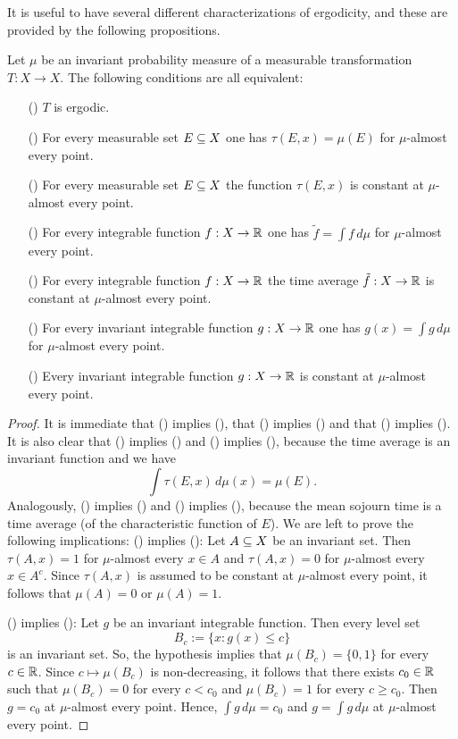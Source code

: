 It is useful to have several different characterizations of ergodicity, and these are provided by the following propositions.
\begin{proposition}\label{ergodic iff invariant function constant}
Let $\mu$ be an invariant probability measure of a measurable transformation $T:X\to X$. The following conditions are all equivalent:
\begin{itemize}
\item[(\rmnum{1})] $T$ is ergodic.
\item[(\rmnum{2})] For every measurable set $E\subseteq X$ one has $\tau(E,x)=\mu(E)$ for $\mu$-almost every point.
\item[(\rmnum{3})] For every measurable set $E\subseteq X$ the function $\tau(E,x)$ is constant at $\mu$-almost every point.
\item[(\rmnum{4})] For every integrable function $f:X\to\mathbb{R}$ one has $\tilde{f}=\int f\,d\mu$ for $\mu$-almost every point.
\item[(\rmnum{5})] For every integrable function $f:X\to\mathbb{R}$ the time average $\tilde{f}:X\to\mathbb{R}$ is constant at $\mu$-almost every point.
\item[(\rmnum{6})] For every invariant integrable function $g:X\to\mathbb{R}$ one has $g(x)=\int g\,d\mu$ for $\mu$-almost every point.
\item[(\rmnum{7})] Every invariant integrable function $g:X\to\mathbb{R}$ is constant at $\mu$-almost every point.   
\end{itemize}
\end{proposition}
\begin{proof}
It is immediate that () implies (), that () implies () and that () implies (). It is also clear that () implies () and () implies (), because the time average is an invariant function and we have
\[\int\tau(E,x)\,d\mu(x)=\mu(E).\]
Analogously, () implies () and () implies (), because the mean sojourn time is a time average (of the characteristic function of $E$). We are left to prove the following implications:
() implies (): Let $A\subseteq X$ be an invariant set. Then $\tau(A,x)=1$ for $\mu$-almost every $x\in A$ and $\tau(A,x)=0$ for $\mu$-almost every $x\in A^c$. Since $\tau(A,x)$ is assumed to be constant at $\mu$-almost every point, it follows that $\mu(A)=0$ or $\mu(A)=1$.\par
() implies (): Let $g$ be an invariant integrable function. Then every level set
\[B_c:=\{x:g(x)\leq c\}\]
is an invariant set. So, the hypothesis implies that $\mu(B_c)=\{0,1\}$ for every $c\in\mathbb{R}$. Since $c\mapsto\mu(B_c)$ is non-decreasing, it follows that there exists $c_0\in\mathbb{R}$ such that $\mu(B_{c})=0$ for every $c<c_0$ and $\mu(B_{c})=1$ for every $c\geq c_0$. Then $g=c_0$ at $\mu$-almost every point. Hence, $\int g\,d\mu=c_0$ and $g=\int g\,d\mu$ at $\mu$-almost every point.
\end{proof}
